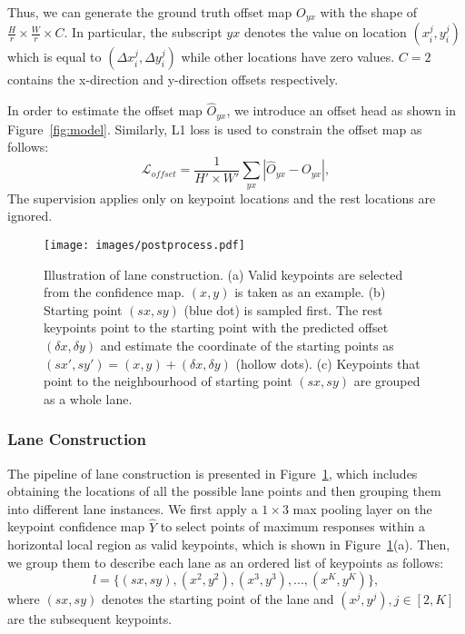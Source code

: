 \documentclass[10pt,twocolumn,letterpaper]{article}
\begin{document}
Thus, we can generate the ground truth offset map $O_{yx}$ with the shape of $\frac{H}{r} \times \frac{W}{r} \times C$. In particular, the subscript $yx$ denotes the value on location $(x_i^j, y_i^j)$ which is equal to $(\Delta x_i^j, \Delta y_i^j)$ while other locations have zero values. $C=2$ contains the x-direction and y-direction offsets respectively. 

In order to estimate the offset map $\hat{O}_{yx}$, we introduce an offset head as shown in Figure~\ref{fig:model}. Similarly, L1 loss is used to constrain the offset map as follows:
\begin{equation}
\label{equation:offsetloss}
    \mathcal{L}_{offset}=\frac{1}{H' \times W'} \sum_{yx}{\left| \hat{O}_{yx} - O_{yx} \right|},
\end{equation}
The supervision applies only on keypoint locations and the rest locations are ignored.

\begin{figure}[!t]
    \centering
    \texttt{[image: images/postprocess.pdf]}
    \caption{Illustration of lane construction. (a) Valid keypoints are selected from the confidence map. $(x,y)$ is taken as an example. (b) Starting point $(sx, sy)$ (blue dot) is sampled first. The rest keypoints point to the starting point with the predicted offset $(\delta x, \delta y)$ and estimate the coordinate of the starting points as $(sx', sy')=(x,y)+(\delta x, \delta y)$ (hollow dots). (c) Keypoints that point to the neighbourhood of starting point $(sx, sy)$ are grouped as a whole lane.}
    \label{fig:postprocess}
\end{figure}

\subsubsection{Lane Construction}

The pipeline of lane construction is presented in Figure~\ref{fig:postprocess}, which includes obtaining the locations of all the possible lane points and then grouping them into different lane instances. 
We first apply a $1\times 3$ max pooling layer on the keypoint confidence map $\hat{Y}$ to select points of maximum responses within a horizontal local region as valid keypoints, which is shown in Figure~\ref{fig:postprocess}(a).
Then, we group them to describe each lane as an ordered list of keypoints as follows:
\begin{equation}\label{equa root}
    l = \{(sx, sy), (x^2, y^2), (x^3, y^3), ..., (x^K, y^K)\},
\end{equation}
where $(sx, sy)$ denotes the starting point of the lane and $(x^j, y^j), j\in [2, K]$ are the subsequent keypoints. 
\end{document}
